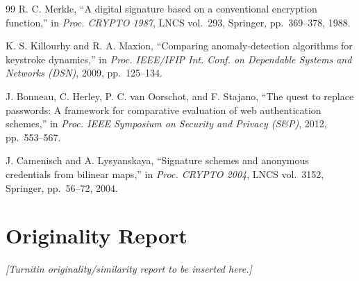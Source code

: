 \documentclass[12pt,a4paper,oneside]{report}
\begin{document}
\begin{thebibliography}{99}
R. C. Merkle, ``A digital signature based on a conventional encryption
function,'' in \textit{Proc. CRYPTO 1987}, LNCS vol.~293, Springer,
pp.~369--378, 1988.

K. S. Killourhy and R. A. Maxion, ``Comparing anomaly-detection algorithms
for keystroke dynamics,'' in \textit{Proc. IEEE/IFIP Int. Conf. on
Dependable Systems and Networks (DSN)}, 2009, pp.~125--134.

J. Bonneau, C. Herley, P. C. van Oorschot, and F. Stajano, ``The quest to
replace passwords: A framework for comparative evaluation of web
authentication schemes,'' in \textit{Proc. IEEE Symposium on Security and
Privacy (S\&P)}, 2012, pp.~553--567.

J. Camenisch and A. Lysyanskaya, ``Signature schemes and anonymous
credentials from bilinear maps,'' in \textit{Proc. CRYPTO 2004}, LNCS
vol.~3152, Springer, pp.~56--72, 2004.

\end{thebibliography}

\clearpage
\chapter*{Originality Report}

\vspace{2cm}
\begin{center}
\textit{[Turnitin originality/similarity report to be inserted here.]}
\end{center}
\end{document}
